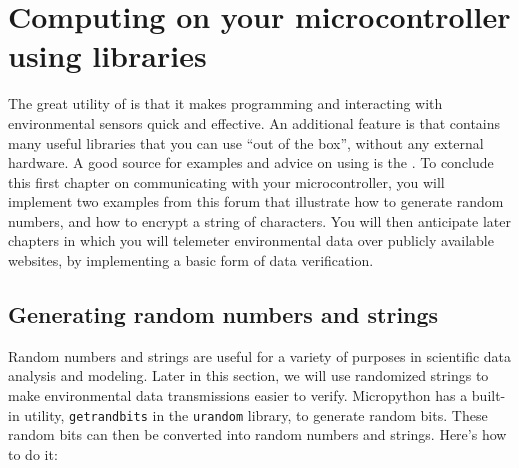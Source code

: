 \section{Computing on your microcontroller using \Micropython libraries}
The great utility of \Micropython is that it makes programming and interacting with environmental sensors quick and effective. 
An additional feature is that \Micropython contains many useful libraries that you can use ``out of the box'', without any external hardware.
A good source for examples and advice on using \Micropython is the .
To conclude this first chapter on communicating with your microcontroller, you will implement two examples from this forum that illustrate how to generate random numbers, and how to encrypt a string of characters.
You will then anticipate later chapters in which you will telemeter environmental data over publicly available websites, by implementing a basic form of data verification.  

\subsection{Generating random numbers and strings}
Random numbers and strings are useful for a variety of purposes in scientific data analysis and modeling. 
Later in this section, we will use randomized strings to make environmental data transmissions easier to verify.
Micropython has a built-in utility, \lstinline{getrandbits} in the \lstinline{urandom} library, to generate random bits.
These random bits can then be converted into random numbers and strings. Here's how to do it:

